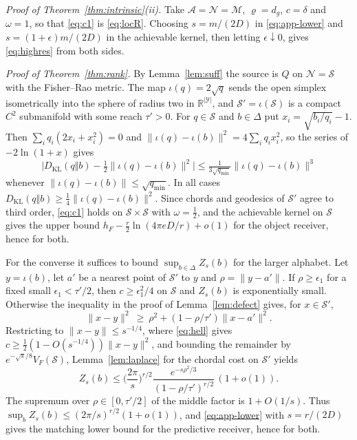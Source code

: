 \documentclass[10pt,journal]{IEEEtran}
\newcommand{\M}{\mathcal M}
\newcommand{\Sset}{\mathcal S}
\newcommand{\KL}{D_{\mathrm{KL}}}
\begin{document}
\emph{Proof of Theorem~\ref{thm:intrinsic}(ii).} Take $\mathcal A=\mathcal N=\M$, $\varrho=d_g$, $c=\delta$ and $\omega=1$, so that \eqref{eq:c1} is \eqref{eq:locR}. Choosing $s=m/(2D)$ in \eqref{eq:app-lower} and $s=(1+\epsilon)m/(2D)$ in the achievable kernel, then letting $\epsilon\downarrow0$, gives \eqref{eq:highres} from both sides.

\emph{Proof of Theorem~\ref{thm:rank}.} By Lemma~\ref{lem:suff} the source is $Q$ on $\mathcal N=\Sset$ with the Fisher--Rao metric. The map $\iota(q)=2\sqrt q$ sends the open simplex isometrically into the sphere of radius two in $\mathbb R^{|\mathcal Y|}$, and $\Sset'=\iota(\Sset)$ is a compact $C^2$ submanifold with some reach $\tau'>0$. For $q\in\Sset$ and $b\in\Delta$ put $x_i=\sqrt{b_i/q_i}-1$. Then $\sum_iq_i(2x_i+x_i^2)=0$ and $\|\iota(q)-\iota(b)\|^2=4\sum_iq_ix_i^2$, so the series of $-2\ln(1+x)$ gives
\begin{equation}
 \Big|\KL(q\Vert b)-\tfrac12\|\iota(q)-\iota(b)\|^2\Big|\le\tfrac{1}{3\sqrt{q_{\min}}}\|\iota(q)-\iota(b)\|^3 \label{eq:hell}
\end{equation}
whenever $\|\iota(q)-\iota(b)\|\le\sqrt{q_{\min}}$. In all cases $\KL(q\Vert b)\ge\frac14\|\iota(q)-\iota(b)\|^2$. Since chords and geodesics of $\Sset'$ agree to third order, \eqref{eq:c1} holds on $\Sset\times\Sset$ with $\omega=\frac12$, and the achievable kernel on $\Sset$ gives the upper bound $h_F-\frac r2\ln(4\pi eD/r)+o(1)$ for the object receiver, hence for both.

For the converse it suffices to bound $\sup_{b\in\Delta}Z_s(b)$ for the larger alphabet. Let $y=\iota(b)$, let $a'$ be a nearest point of $\Sset'$ to $y$ and $\rho=\|y-a'\|$. If $\rho\ge\epsilon_1$ for a fixed small $\epsilon_1<\tau'/2$, then $c\ge\epsilon_1^2/4$ on $\Sset$ and $Z_s(b)$ is exponentially small. Otherwise the inequality in the proof of Lemma~\ref{lem:defect} gives, for $x\in\Sset'$,
\begin{equation}
 \|x-y\|^2\ \ge\ \rho^2+(1-\rho/\tau')\|x-a'\|^2 .
\end{equation}
Restricting to $\|x-y\|\le s^{-1/4}$, where \eqref{eq:hell} gives $c\ge\frac12(1-O(s^{-1/4}))\|x-y\|^2$, and bounding the remainder by $e^{-\sqrt s/8}V_F(\Sset)$, Lemma~\ref{lem:laplace} for the chordal cost on $\Sset'$ yields
\begin{equation}
 Z_s(b)\le\Big(\frac{2\pi}{s}\Big)^{r/2}\frac{e^{-s\rho^2/3}}{(1-\rho/\tau')^{r/2}}\,(1+o(1)) .
\end{equation}
The supremum over $\rho\in[0,\tau'/2]$ of the middle factor is $1+O(1/s)$. Thus $\sup_bZ_s(b)\le(2\pi/s)^{r/2}(1+o(1))$, and \eqref{eq:app-lower} with $s=r/(2D)$ gives the matching lower bound for the predictive receiver, hence for both.
\end{document}
